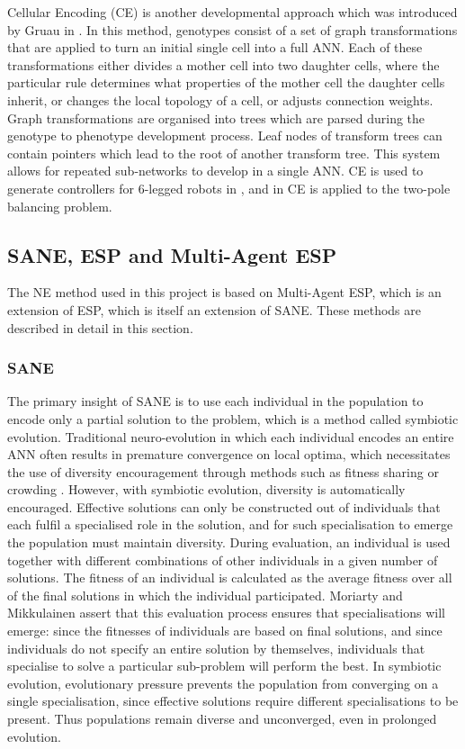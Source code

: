 \documentclass[12pt]{article} %
\begin{document}
Cellular Encoding (CE) is another developmental approach which was introduced by Gruau in \cite{Gruau1992}. In this method, genotypes consist of a set of graph transformations that are applied to turn an initial single cell into a full ANN. Each of these transformations either divides a mother cell into two daughter cells, where the particular rule determines what properties of the mother cell the daughter cells inherit, or changes the local topology of a cell, or adjusts connection weights. Graph transformations are organised into trees which are parsed during the genotype to phenotype development process. Leaf nodes of transform trees can contain pointers which lead to the root of another transform tree. This system allows for repeated sub-networks to develop in a single ANN. CE is used to generate controllers for 6-legged robots in \cite{Gruau1994}, and in \cite{Gruau1996} CE is applied to the two-pole balancing problem.

\subsection{SANE, ESP and Multi-Agent ESP}

The NE method used in this project is based on Multi-Agent ESP, which is an extension of ESP, which is itself an extension of SANE. These methods are described in detail in this section.

\subsubsection{SANE}

The primary insight of SANE \cite{Moriarty1996} is to use each individual in the population to encode only a partial solution to the problem, which is a method called symbiotic evolution. Traditional neuro-evolution in which each individual encodes an entire ANN often results in premature convergence on local optima, which necessitates the use of diversity encouragement through methods such as fitness sharing \cite{Goldberg1987}\cite{Sareni1998} or crowding \cite{Sareni1998}. However, with symbiotic evolution, diversity is automatically encouraged. Effective solutions can only be constructed out of individuals that each fulfil a specialised role in the solution, and for such specialisation to emerge the population must maintain diversity. During evaluation, an individual is used together with different combinations of other individuals in a given number of solutions. The fitness of an individual is calculated as the average fitness over all of the final solutions in which the individual participated. Moriarty and Mikkulainen assert that this evaluation process ensures that specialisations will emerge: since the fitnesses of individuals are based on final solutions, and since individuals do not specify an entire solution by themselves, individuals that specialise to solve a particular sub-problem will perform the best. In symbiotic evolution, evolutionary pressure prevents the population from converging on a single specialisation, since effective solutions require different specialisations to be present. Thus populations remain diverse and unconverged, even in prolonged evolution.
\end{document}
